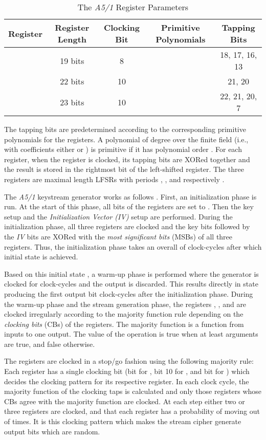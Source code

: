 \documentclass{llncs}
\begin{document}
\begin{table}[ht]
\caption{The \emph{A5/1} Register Parameters} \centering      \begin{tabular}{c c c c c}  \hline\hline                        Register & Register Length & Clocking Bit & Primitive Polynomials & Tapping Bits \\ [0.5ex] \hline                     & 19 bits & 8 &  & 18, 17, 16, 13 \\ 
 & 22 bits & 10 &  & 21, 20 \\ 
 & 23 bits & 10 &  & 22, 21, 20, 7  \\ [1ex]       \hline     \end{tabular} 
\label{par}  \end{table}

The tapping bits are predetermined according to the corresponding primitive polynomials for the registers. A polynomial of degree  over the finite field  (i.e., with coefficients either  or ) is primitive if it has polynomial order .
For each register, when the register is clocked, its tapping bits are XORed together and the result is stored in the rightmost bit of the left-shifted register. The three registers are maximal length LFSRs with periods , , and  respectively \cite{[period]}.

The \emph {A5/1} keystream generator works as follows \cite{[Bri]}. First, an initialization phase is run. At the start of this phase, all bits of the registers are set to . Then the key setup and the \emph{Initialization Vector (IV)} setup are performed. During the initialization phase, all three registers are clocked and the key bits followed by the \emph{IV} bits are XORed with the \emph{most significant bits} (MSBs) of all three registers. Thus, the initialization phase takes an overall of  clock-cycles after which initial state  is achieved.

Based on this initial state , a warm-up phase is performed where the generator is clocked for  clock-cycles and the output is discarded. This results directly in state  producing the first output bit  clock-cycles after the initialization phase. During the warm-up phase and the stream generation phase, the registers , , and  are clocked irregularly according to the majority function rule \cite{[Donald]} depending on the \emph{clocking bits} (CBs) of the registers. The majority function is a function from  inputs to one output. The value of the operation is true when at least  arguments are true, and false otherwise.

The registers are clocked in a stop/go fashion using the following majority rule: Each register has a single clocking bit (bit  for , bit 10 for , and bit  for ) which decides the clocking pattern for its respective register. In each clock cycle, the majority function of the clocking taps is calculated and only those registers whose CBs agree with the majority function are clocked. At each step either two or three registers are clocked, and that each register has a probability of moving  out of  times. It is this clocking pattern which makes the stream cipher generate output bits which are random.
\end{document}
